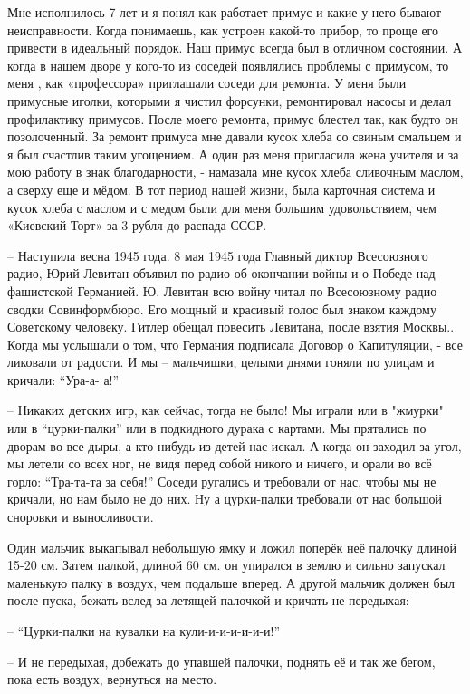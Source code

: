 Мне исполнилось 7 лет и я понял как работает примус и какие у него бывают
неисправности. Когда понимаешь, как устроен какой-то прибор, то проще его
привести в идеальный порядок. Наш примус всегда был в отличном состоянии. А
когда в нашем дворе у кого-то из соседей появлялись проблемы с примусом, то
меня , как «профессора» приглашали соседи для ремонта. У меня были примусные
иголки, которыми я чистил форсунки, ремонтировал насосы и делал профилактику
примусов. После моего ремонта, примус блестел так, как будто он позолоченный.
За ремонт примуса мне давали кусок хлеба со свиным смальцем и я был счастлив
таким угощением. А один раз меня пригласила жена учителя и за мою работу в знак
благодарности, - намазала  мне кусок хлеба сливочным маслом, а сверху еще и
мёдом. В тот период нашей  жизни, была карточная система  и кусок хлеба с
маслом и с медом были для меня большим удовольствием, чем «Киевский Торт» за 3
рубля до распада СССР.

– Наступила весна 1945 года. 8 мая 1945 года Главный диктор Всесоюзного радио,
Юрий Левитан объявил по радио об окончании войны и о Победе над фашистской
Германией. Ю. Левитан всю войну читал по Всесоюзному радио сводки
Совинформбюро. Его мощный и красивый голос был знаком каждому Советскому
человеку.  Гитлер обещал повесить Левитана, после взятия Москвы.. Когда мы
услышали  о том, что Германия подписала Договор о Капитуляции, - все ликовали
от радости. И мы – мальчишки, целыми днями гоняли по улицам и кричали: “Ура-а-
а!”

– Никаких детских игр, как сейчас, тогда не было! Мы играли или в  "жмурки" или
в “цурки-палки” или в подкидного дурака с картами. Мы прятались по дворам во
все дыры, а кто-нибудь из детей нас искал. А когда он заходил за угол, мы
летели со всех ног, не видя перед собой никого и ничего, и орали во всё горло:
“Тра-та-та за себя!” Соседи ругались и требовали от нас, чтобы мы не кричали,
но нам было не до них. Ну а цурки-палки требовали от нас большой сноровки и
выносливости.

Один мальчик выкапывал небольшую ямку и ложил поперёк неё палочку длиной 15-20
см. Затем  палкой, длиной 60 см. он упирался в землю и сильно запускал
маленькую палку в воздух, чем подальше вперед. А другой мальчик должен был
после пуска,  бежать вслед за летящей палочкой и кричать не передыхая:

– “Цурки-палки на кувалки на кули-и-и-и-и-и-и!”

– И не передыхая, добежать до упавшей палочки, поднять её и так же бегом, пока есть воздух, вернуться на место. 

